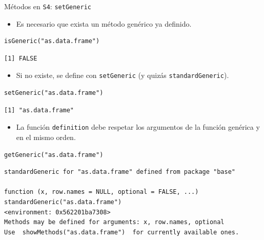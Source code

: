 \documentclass[xcolor={usenames,svgnames,dvipsnames}]{beamer}
\begin{document}
\begin{frame}[label={sec:orgeec73ff},fragile]{Métodos en \texttt{S4}: \texttt{setGeneric}}
 \begin{itemize}
\item Es necesario que exista un método genérico ya definido.
\end{itemize}
\lstset{language=r,label= ,caption= ,captionpos=b,numbers=none}
\begin{lstlisting}
isGeneric("as.data.frame")
\end{lstlisting}

\begin{verbatim}
[1] FALSE
\end{verbatim}


\begin{itemize}
\item Si no existe, se define con \texttt{setGeneric} (y quizás \texttt{standardGeneric}).
\end{itemize}
\lstset{language=r,label= ,caption= ,captionpos=b,numbers=none}
\begin{lstlisting}
setGeneric("as.data.frame")
\end{lstlisting}

\begin{verbatim}
[1] "as.data.frame"
\end{verbatim}


\begin{itemize}
\item La función \texttt{definition} debe respetar los argumentos de la función genérica y en el mismo orden.
\end{itemize}
\lstset{language=r,label= ,caption= ,captionpos=b,numbers=none}
\begin{lstlisting}
getGeneric("as.data.frame")
\end{lstlisting}

\begin{verbatim}
standardGeneric for "as.data.frame" defined from package "base"

function (x, row.names = NULL, optional = FALSE, ...) 
standardGeneric("as.data.frame")
<environment: 0x562201ba7308>
Methods may be defined for arguments: x, row.names, optional
Use  showMethods("as.data.frame")  for currently available ones.
\end{verbatim}
\end{frame}
\end{document}
